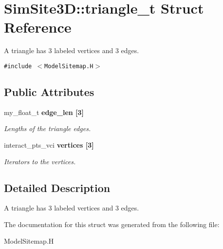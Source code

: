 \section{SimSite3D::triangle\_\-t Struct Reference}
\label{structSimSite3D_1_1triangle__t}
A triangle has 3 labeled vertices and 3 edges.  


{\tt \#include $<$Model\-Sitemap.H$>$}

\subsection*{Public Attributes}
\begin{CompactItemize}
\item 
my\_\-float\_\-t \bf{edge\_\-len} [3]\label{structSimSite3D_1_1triangle__t_054eeaf8f6d93e76685c52338351cc40}

\begin{CompactList}\small\item\em Lengths of the triangle edges. \item\end{CompactList}\item 
interact\_\-pts\_\-vci \bf{vertices} [3]\label{structSimSite3D_1_1triangle__t_6c50fcf5765d863b447d3f85d2ed5bdb}

\begin{CompactList}\small\item\em Iterators to the vertices. \item\end{CompactList}\end{CompactItemize}


\subsection{Detailed Description}
A triangle has 3 labeled vertices and 3 edges. 



The documentation for this struct was generated from the following file:\begin{CompactItemize}
\item 
Model\-Sitemap.H\end{CompactItemize}
